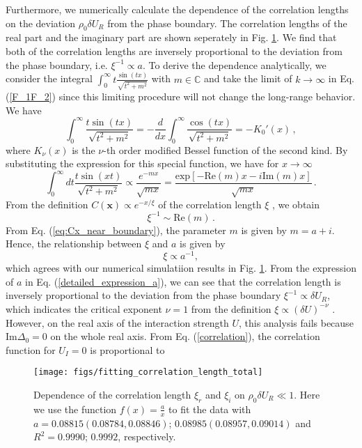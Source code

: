 \documentclass[aps,onecolumn,nofootinbib,superscriptaddress,notitlepage,longbibliography]{revtex4-1}
\begin{document}
Furthermore, we numerically calculate the dependence of the correlation lengths on the deviation
$\rho_{0}\delta U_{R}$ from the phase boundary. The correlation lengths of the real part and the imaginary
part are shown seperately in Fig. \ref{fig3}. We find that both of the correlation lengths are inversely proportional to the deviation from the phase boundary, i.e. $\xi^{-1}\propto a$. To derive the dependence analytically, we consider the integral $\int_0^{\infty}t\frac{\sin(tx)}{\sqrt{t^2+m^2}}$ with $m\in\mathbb{C}$ and take the limit of $k\to\infty$ in Eq. (\ref{F_1F_2}) since this limiting procedure will not change the long-range behavior. We have
\begin{equation}
   \int_0^{\infty}\frac{t\sin(tx)}{\sqrt{t^2+m^2}}=-\frac{d}{dx}\int_0^{\infty}\frac{\cos(tx)}{\sqrt{t^2+m^2}}=-K_0'(x)\,,
\end{equation}
where $K_{\nu}(x)$ is the $\nu$-th order modified Bessel function of the second kind. By substituting the expression for this special function, we have for $x\rightarrow\infty$
\begin{equation}
\int_{0}^{\infty}dt\frac{t\sin(xt)}{\sqrt{t^{2}+m^{2}}}\propto \frac{e^{-mx}}{\sqrt{mx}}= \frac{\text{exp}[-\text{Re}(m)x-i\text{Im}(m)x]}{\sqrt{mx}}\,.
\end{equation}
From the definition $C(\bm{x})\propto e^{-x/\xi}$ of the correlation length $\xi$ \cite{Sachdev:2011uj}, we obtain
\begin{equation}
    \xi^{-1}\sim\text{Re}(m)\,.
\end{equation}
From Eq. (\ref{eq:Cx_near_boundary}), the parameter $m$ is given by $m=a+i$. Hence, the relationship between $\xi$ and $a$ is given by
\begin{equation}
  \xi\propto a^{-1},\label{corre_length}
\end{equation}
which agrees with our numerical simulatiion results in Fig. \ref{fig3}. From the expression of $a$ in Eq. (\ref{detailed_expression_a}), we can see that the correlation length is inversely proportional to the deviation from the phase boundary $\xi^{-1}\propto\delta U_R$, which indicates the critical exponent $\nu=1$ from the definition $\xi\propto(\delta U)^{-\nu}$ \cite{Sachdev:2011uj}. However, on the real axis of the interaction strength $U$, this analysis fails because $\text{Im}\Delta_0=0$ on the whole real axis. From Eq. (\ref{correlation}),  the correlation function for $U_I=0$ is proportional to
\begin{figure}
	\centering \texttt{[image: figs/fitting\_correlation\_length\_total]}
	\caption{Dependence of the correlation length $\xi_r$ and $\xi_i$ on $\rho_{0}\delta U_{R}\ll1$. Here we use the function $f(x)=\frac{a}{x}$ to fit the data with
		$a=0.08815(0.08784,0.08846)$; $0.08985(0.08957,0.09014)$ and $R^{2}=0.9990$;
		$0.9992$, respectively.}
	\label{fig3}
\end{figure}
\end{document}
